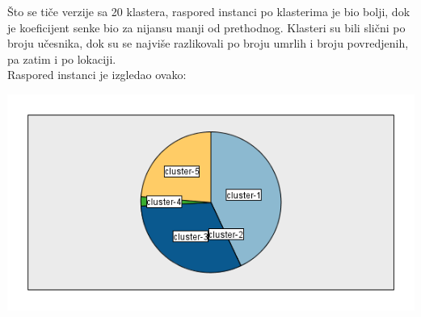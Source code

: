 \documentclass[
	12pt,			
	openright,		
	oneside,			
	a4paper,		
	english,			
	]{article}
\begin{document}
    Što se tiče verzije sa 20 klastera, raspored instanci po klasterima je bio bolji, dok je koeficijent senke bio za nijansu manji od prethodnog.
    Klasteri su bili slični po broju učesnika, dok su se najviše razlikovali po broju umrlih i broju povredjenih, pa zatim i po lokaciji.
    \\
    Raspored instanci je izgledao ovako:
    \begin{center}
    \includegraphics[width = 15cm]{Slike/KM_Year5.png}
    \end{center}
\end{document}
